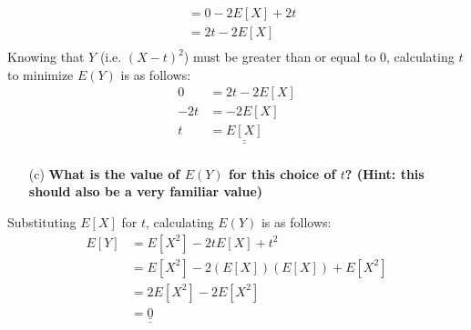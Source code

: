 \documentclass[12pt,a4paper]{article}
\numberwithin{equation}{subsection}
\def\doubleunderline#1{\underline{\underline{#1}}}
\begin{document}
\begin{enumerate}
\begin{equation*}
\begin{split}
& = 0 - 2E[X] + 2t \\
& = 2t - 2E[X] \\
\end{split}
\end{equation*}
Knowing that $Y$ (i.e. $(X - t)^2$) must be greater than or equal to 0, calculating $t$ to minimize $E(Y)$ is as follows:
\begin{equation*}
\begin{split}
0 & = 2t - 2E[X] \\
-2t & = -2E[X] \\
t & = \doubleunderline{E[X]}  \\
\end{split}
\end{equation*}
\begin{enumerate}
\item[(c)] \textbf{What is the value of $E(Y)$ for this choice of $t$?
(Hint: this should also be a very familiar value)}
\end{enumerate}
Substituting $E[X]$ for $t$, calculating $E(Y)$ is as follows:
\begin{equation*}
\begin{split}
E[Y] & = E[X^2] - 2tE[X] + t^2 \\
& = E[X^2] - 2(E[X])(E[X]) + E[X^2] \\
& = 2E[X^2] - 2E[X^2] \\
& = \doubleunderline{0}  \\
\end{split}
\end{equation*}

\end{enumerate}
\end{document}
